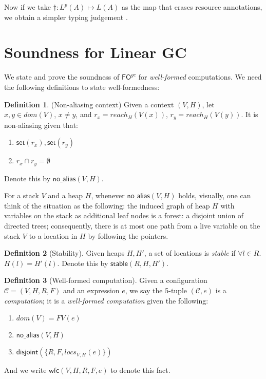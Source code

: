 \documentclass[11pt]{article}
\newcommand{\ms}[1]{\ensuremath{\mathsf{#1}}}
\newcommand{\na}[1]{\mathsf{no\_alias}(#1)}
\newcommand{\stable}[1]{\mathsf{stable}(#1)}
\newcommand{\dist}[1]{\mathsf{disjoint}(#1)}
\newcommand{\wfc}[5]{\mathsf{wfc}(#1,#2,#3,#4,#5)}
\theoremstyle{definition}
\newtheorem{definition}{Definition}[section]
\begin{document}
Now if we take $\dagger :  L^p(A) \mapsto L(A)$ as the map that erases resource annotations, 
 we obtain a simpler typing judgement .

\newpage
\section{Soundness for Linear GC}
We state and prove the soundness of $\ms{FO}^{gc}$ for \emph{well-formed} computations. We need the following 
definitions to state well-formedness:

\begin{definition}(Non-aliasing context)
Given a context $(V,H)$, let
$x,y \in dom(V)$, $x \ne y$, and $r_x = reach_H(V(x))$, $r_y = reach_H(V(y))$.
It is non-aliasing given that:
\begin{enumerate}
\item $\ms{set}(r_x), \ms{set}(r_y)$
\item $r_x \cap r_y = \emptyset$
\end{enumerate}
Denote this by $\na{V,H}$.
\end{definition}

For a stack $V$ and a heap $H$, whenever $\na{V,H}$ holds, visually, one can think of the situation as the following: the induced graph of heap $H$ with variables on the stack as additional leaf nodes is a forest: a disjoint union of directed trees; consequently, there is at most one path from a live variable on the stack $V$ to a location in $H$ by following the pointers.

\begin{definition}[Stability]
Given heaps $H,H'$, a set of locations is \emph{stable} if $\forall l \in R$. $H(l) = H'(l)$. Denote this by
$\stable{R,H,H'}$.
\end{definition}

\begin{definition}[Well-formed computation]
Given a configuration $\mathcal{C} = (V,H,R,F)$ and an expression $e$, 
we say the 5-tuple $(\mathcal{C},e)$ is a \emph{computation}; it is a \emph{well-formed computation} 
given the following:
\begin{enumerate}
\item $dom(V) = FV(e)$
\item $\na{V,H}$
\item $\dist{\{R,F,locs_{V,H}(e)\}}$
\end{enumerate} 
And we write $\wfc{V}{H}{R}{F}{e}$ to denote this fact.
\end{definition}
\end{document}
